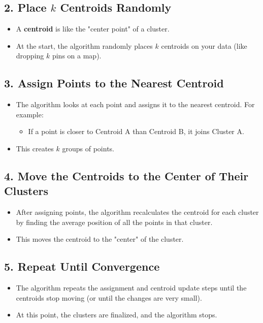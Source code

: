 \documentclass{article}
\begin{document}
	\subsection{2. Place \( k \) Centroids Randomly}
	\begin{itemize}
		\item A \textbf{centroid} is like the "center point" of a cluster.
		\item At the start, the algorithm randomly places \( k \) centroids on your data (like dropping \( k \) pins on a map).
	\end{itemize}
	
	\subsection{3. Assign Points to the Nearest Centroid}
	\begin{itemize}
		\item The algorithm looks at each point and assigns it to the nearest centroid. For example:
		\begin{itemize}
			\item If a point is closer to Centroid A than Centroid B, it joins Cluster A.
		\end{itemize}
		\item This creates \( k \) groups of points.
	\end{itemize}
	
	\subsection{4. Move the Centroids to the Center of Their Clusters}
	\begin{itemize}
		\item After assigning points, the algorithm recalculates the centroid for each cluster by finding the average position of all the points in that cluster.
		\item This moves the centroid to the "center" of the cluster.
	\end{itemize}
	
	\subsection{5. Repeat Until Convergence}
	\begin{itemize}
		\item The algorithm repeats the assignment and centroid update steps until the centroids stop moving (or until the changes are very small).
		\item At this point, the clusters are finalized, and the algorithm stops.
	\end{itemize}
	
\end{document}

